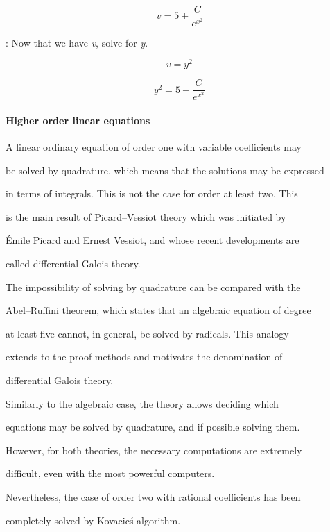 $$v=5+\frac{C}{e^{x^2}}$$



:   Now that we have \textit{v}, solve for \textit{y}.



$$v=y^2 \,$$



$$y^2=5+\frac{C}{e^{x^2}} \,$$



\paragraph{Higher order linear equations}



A linear ordinary equation of order one with variable coefficients may

be solved by quadrature, which means that the solutions may be expressed

in terms of integrals. This is not the case for order at least two. This

is the main result of Picard--Vessiot theory which was initiated by

Émile Picard and Ernest Vessiot, and whose recent developments are

called differential Galois theory.



The impossibility of solving by quadrature can be compared with the

Abel--Ruffini theorem, which states that an algebraic equation of degree

at least five cannot, in general, be solved by radicals. This analogy

extends to the proof methods and motivates the denomination of

differential Galois theory.



Similarly to the algebraic case, the theory allows deciding which

equations may be solved by quadrature, and if possible solving them.

However, for both theories, the necessary computations are extremely

difficult, even with the most powerful computers.



Nevertheless, the case of order two with rational coefficients has been

completely solved by Kovacic\'s algorithm.



